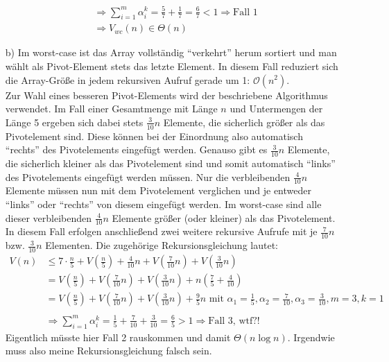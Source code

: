 \documentclass{article}
\begin{document}
\begin{enumerate}
\begin{align*}
            &\Rightarrow \sum_{i=1}^{m} \alpha_i^k = \frac{5}{7}+\frac{1}{7} = \frac{6}{7} < 1 \Rightarrow \text{Fall 1}\\
            &\Rightarrow V_{wc}(n) \in \Theta (n)
        \end{align*}
        \item[b)] Im worst-case ist das Array vollständig "`verkehrt"' herum sortiert und man wählt als Pivot-Element stets das letzte Element. In diesem Fall reduziert sich die Array-Größe in jedem rekursiven Aufruf gerade um 1: $\mathcal{O}(n^2)$.\\
        Zur Wahl eines besseren Pivot-Elements wird der beschriebene Algorithmus verwendet. Im Fall einer Gesamtmenge mit Länge $n$ und Untermengen der Länge 5 ergeben sich dabei stets $\frac{3}{10}n$ Elemente, die sicherlich größer als das Pivotelement sind. Diese können bei der Einordnung also automatisch "`rechts"' des Pivotelements eingefügt werden. Genauso gibt es $\frac{3}{10}n$ Elemente, die sicherlich kleiner als das Pivotelement sind und somit automatisch "`links"' des Pivotelements eingefügt werden müssen. Nur die verbleibenden $\frac{4}{10}n$ Elemente müssen nun mit dem Pivotelement verglichen und je entweder "`links"' oder "`rechts"' von diesem eingefügt werden. Im worst-case sind alle dieser verbleibenden $\frac{4}{10}n$ Elemente größer (oder kleiner) als das Pivotelement. In diesem Fall erfolgen anschließend zwei weitere rekursive Aufrufe mit je $\frac{7}{10}n$ bzw. $\frac{3}{10}n$ Elementen. Die zugehörige Rekursionsgleichung lautet: 
        \begin{align*}
            V(n) &\le 7\cdot \frac{n}{5} + V\left(\frac{n}{5}\right) + \frac{4}{10}n + V\left(\frac{7}{10}n\right) + V\left(\frac{3}{10}n\right) \\
            &= V\left(\frac{n}{5}\right) + V\left(\frac{7}{10}n\right) + V\left(\frac{3}{10}n\right) + n\left(\frac{7}{5} + \frac{4}{10}\right) \\
            &= V\left(\frac{n}{5}\right) + V\left(\frac{7}{10}n\right) + V\left(\frac{3}{10}n\right) + \frac{9}{5}n \text{ mit } \alpha_1 = \frac{1}{5}, \alpha_2 = \frac{7}{10}, \alpha_3 = \frac{3}{10}, m=3, k=1 \\\\
            &\Rightarrow \sum_{i=1}^{m} \alpha_i^k = \frac{1}{5} + \frac{7}{10} + \frac{3}{10} = \frac{6}{5} > 1 \Rightarrow \text{Fall 3, wtf?!}
        \end{align*}
        Eigentlich müsste hier Fall 2 rauskommen und damit $\Theta(n \log n)$. Irgendwie muss also meine Rekursionsgleichung falsch sein. 
    \end{enumerate}
\end{document}
